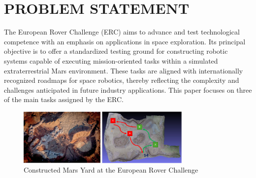 \documentclass[letterpaper, 10 pt, conference]{ieeeconf}  %
\begin{document}
\section{PROBLEM STATEMENT}
The European Rover Challenge (ERC) aims to advance and test technological competence with an emphasis on applications in space exploration. Its principal objective is to offer a standardized testing ground for constructing robotic systems capable of executing mission-oriented tasks within a simulated extraterrestrial Mars environment. These tasks are aligned with internationally recognized roadmaps for space robotics, thereby reflecting the complexity and challenges anticipated in future industry applications. This paper focuses on three of the main tasks assigned by the ERC.
    \begin{figure}[htbp]
    \centerline{\includegraphics[width=85mm]{Navigation.png}}
    \caption{Constructed Mars Yard at the European Rover Challenge \cite{ERC}}
    \label{nav}
    \end{figure}
\end{document}
